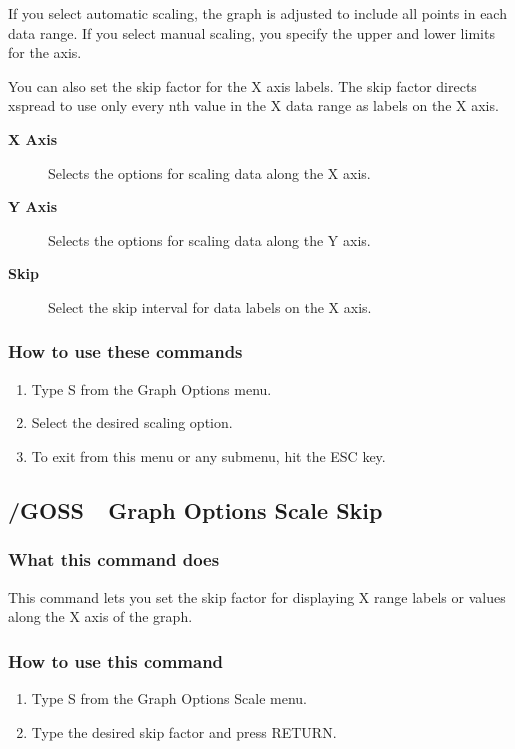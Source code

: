 If you select automatic scaling, the graph is adjusted to include all 
points in each data range.  If you select manual scaling, you specify 
the upper and lower limits for the axis.

You can also set the skip factor for the X axis labels.  The skip 
factor directs xspread to use only every nth value in the X data range 
as labels on the X axis.

\begin{description}
\item[{\bf X Axis}]{  Selects the options for scaling data along the X axis.}
\item[{\bf Y Axis}]{  Selects the options for scaling data along the Y axis.}
\item[{\bf Skip}]  {Select the skip interval for data labels on the X axis.}
\end{description}

\subsubsection*{How to use these commands}
\begin{enumerate}
\item{Type S from the Graph Options menu.}
\item{Select the desired scaling option.}
\item{To exit from this menu or any submenu, hit the ESC key.}
\end{enumerate}

\subsection*{/GOSS\ \    Graph Options Scale Skip}

\subsubsection*{What this command does}
This command lets you set the skip factor for displaying X range 
labels or values along the X axis of the graph.

\subsubsection*{How to use this command}
\begin{enumerate}
\item{Type S from the Graph Options Scale menu.}
\item{Type the desired skip factor and press RETURN.}
\end{enumerate}

